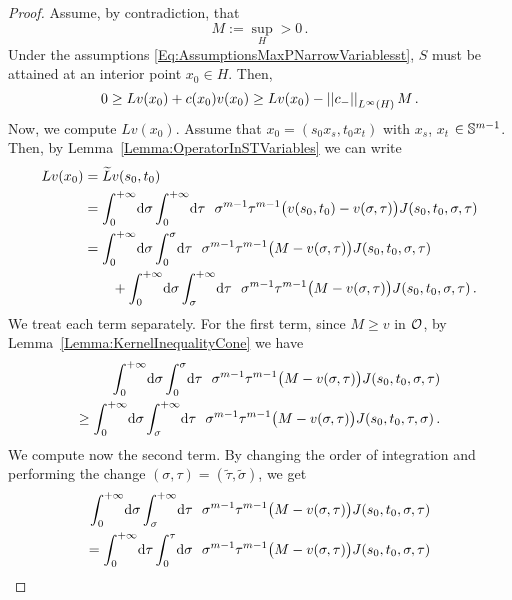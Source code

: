 \begin{proof}
	Assume, by contradiction, that
	$$
	M := \sup_H > 0\,.
	$$
	Under the assumptions \eqref{Eq:AssumptionsMaxPNarrowVariablesst}, $S$ must be attained at an interior point $x_0 \in H$. Then,
	\begin{equation}
	\label{Eq:InequalitiesMaxPNarrowProofVariablesst}
	0 \geq L v(x_0) + c(x_0)v(x_0) \geq L v(x_0) - \left | \left |{c_-} \right | \right |_{L^\infty(H)}M\,.
	\end{equation} 
	Now, we compute $L v(x_0)$. Assume that $x_0 = (s_0 x_s, t_0 x_t)$ with $x_s$, $x_t$ $\in \mathbb{S}^{m-1}$. Then, by Lemma~\ref{Lemma:OperatorInSTVariables} we can write
	\begin{align*}
	Lv(x_0) &= \widetilde{L} v (s_0,t_0) \\
	&=  \int_0^{+\infty} \!\! \d \sigma \int_0^{+\infty} \!\! \d \tau \ \ \sigma^{m-1} \tau^{m-1} \big(v(s_0,t_0) - v(\sigma, \tau)\big) J(s_0,t_0,\sigma, \tau)   \\
	& = \int_0^{+\infty}  \!\! \d \sigma \int_0^{\sigma}  \!\! \d \tau \ \ \sigma^{m-1} \tau^{m-1} \big(M - v(\sigma, \tau)\big)J(s_0,t_0,\sigma, \tau)   \\
	& \quad \quad + \int_0^{+\infty}  \!\!  \d \sigma \int_{\sigma}^{+\infty} \!\!  \d \tau \ \ \sigma^{m-1} \tau^{m-1} \big(M - v(\sigma, \tau)\big) J(s_0,t_0,\sigma, \tau)\,.
	\end{align*}
	We treat each term separately. For the first term, since $M \geq v$ in $\mathcal{O}$, by Lemma~\ref{Lemma:KernelInequalityCone} we have
	\begin{align*}
	\int_0^{+\infty}  \!\! \d \sigma \int_0^{\sigma}  \!\! \d \tau \ \ \sigma^{m-1} \tau^{m-1} \big(M - v(\sigma, \tau)\big)J(s_0,t_0,\sigma, \tau)   \\
	\geq \int_0^{+\infty}  \!\!  \d \sigma \int_{\sigma}^{+\infty} \!\!  \d \tau \ \ \sigma^{m-1} \tau^{m-1} \big(M - v(\sigma, \tau)\big) J(s_0,t_0, \tau, \sigma)\,.
	\end{align*}
	We compute now the second term. By changing the order of integration and performing the change $(\sigma,\tau) = (\tilde{\tau}, \tilde{\sigma})$, we get
	\begin{align*}
	\int_0^{+\infty} \!\!  \d \sigma \int_{\sigma}^{+\infty} \!\!  \d \tau \ \ \sigma^{m-1} \tau^{m-1} \big(M - v(\sigma, \tau)\big) J(s_0,t_0,\sigma, \tau) \\
	=  \int_{0}^{+\infty}  \!\! \d \tau \int_0^{\tau}   \!\! \d \sigma \ \ \sigma^{m-1} \tau^{m-1}\big(M - v(\sigma, \tau)\big) J(s_0,t_0,\sigma, \tau)   \\

\end{align*}
\end{proof}
